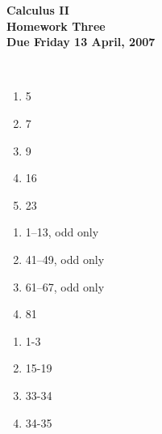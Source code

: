 \documentclass[12pt]{article}
\begin{document}
\pagestyle{empty}
 
\begin{center}
{\large {\bf Calculus II}}\\
\medskip
{\large {\bf Homework Three}}\\
\medskip
{ {\bf Due Friday 13 April, 2007}}\\
\end{center}

\hspace{2mm}\\


\begin{enumerate}
\setlength{\itemsep}{-1mm}
  \item 5
  \item 7
  \item 9
  \item 16
  \item 23

\end{enumerate}


\begin{enumerate}
\setlength{\itemsep}{-1mm}
  \item 1--13, odd only
  \item 41--49, odd only
  \item 61--67, odd only
  \item 81
\end{enumerate}



\begin{enumerate}
\setlength{\itemsep}{-1mm}
  \item 1-3
  \item 15-19
  \item 33-34
  \item 34-35

\end{enumerate}
\end{document}
